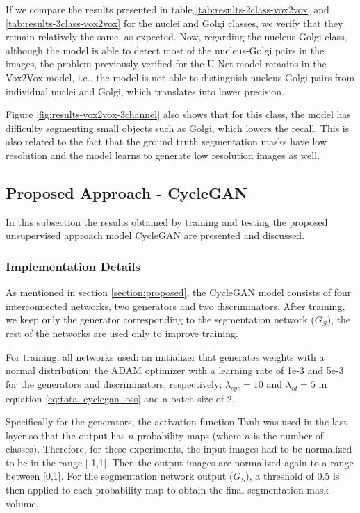 If we compare the results presented in table \ref{tab:results-2class-vox2vox} and \ref{tab:results-3class-vox2vox} for the nuclei and Golgi classes, we verify that they remain relatively the same, as expected. Now, regarding the nucleus-Golgi class, although the model is able to detect most of the nucleus-Golgi pairs in the images, the problem previously verified for the U-Net model remains in the Vox2Vox model, i.e., the model is not able to distinguish nucleus-Golgi pairs from individual nuclei and Golgi, which translates into lower precision. 

Figure \ref{fig:results-vox2vox-3channel} also shows that for this class, the model has difficulty segmenting small objects such as Golgi, which lowers the recall. This is also related to the fact that the ground truth segmentation masks have low resolution and the model learns to generate low resolution images as well.


\subsection{Proposed Approach - CycleGAN}

In this subsection the results obtained by training and testing the proposed unsupervised approach model CycleGAN are presented and discussed.

\subsubsection*{Implementation Details}

As mentioned in section \ref{section:proposed}, the CycleGAN model consists of four interconnected networks, two generators and two discriminators. After training, we keep only the generator corresponding to the segmentation network ($G_S$), the rest of the networks are used only to improve training. 

For training, all networks used: an initializer that generates weights with a normal distribution; the ADAM optimizer with a learning rate of 1e-3 and 5e-3 for the generators and discriminators, respectively; $\lambda_{cyc} = 10$ and $\lambda_{id} = 5$ in equation \ref{eq:total-cyclegan-loss} and a batch size of 2.

Specifically for the generators, the activation function \ac{Tanh} was used in the last layer so that the output has $n$-probability maps (where $n$ is the number of classes). Therefore, for these experiments, the input images had to be normalized to be in the range [-1,1]. Then the output images are normalized again to a range between [0,1]. For the segmentation network output ($G_S$), a threshold of 0.5 is then applied to each probability map to obtain the final segmentation mask volume.

